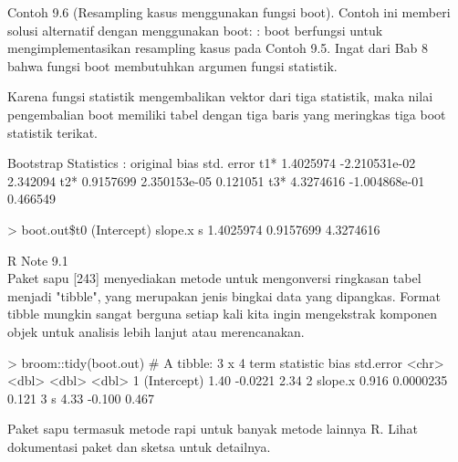 \documentclass[a4paper,12pt]{article}
\theoremstyle{definition}
\begin{document}
Contoh 9.6 
(Resampling kasus menggunakan fungsi boot). Contoh ini memberi solusi alternatif dengan menggunakan boot: : boot berfungsi untuk mengimplementasikan resampling kasus pada Contoh 9.5. Ingat dari Bab 8 bahwa fungsi boot membutuhkan argumen fungsi statistik.
Karena fungsi statistik mengembalikan vektor dari tiga statistik, maka nilai pengembalian boot memiliki tabel dengan tiga baris yang meringkas tiga boot statistik terikat.
\begin{spverbatim}
Bootstrap Statistics :
     original          bias  std. error
t1* 1.4025974 -2.210531e-02  2.342094
t2* 0.9157699  2.350153e-05  0.121051
t3* 4.3274616 -1.004868e-01  0.466549
\end{spverbatim} 

\begin{spverbatim}
> boot.out\$t0
(Intercept) slope.x s
1.4025974 0.9157699 4.3274616
\end{spverbatim}
R Note 9.1\\ 

Paket sapu [243] menyediakan metode untuk mengonversi ringkasan tabel menjadi "tibble", yang merupakan jenis bingkai data yang dipangkas. Format tibble mungkin sangat berguna setiap kali kita ingin mengekstrak komponen objek untuk analisis lebih lanjut atau merencanakan.\\
\begin{spverbatim}
> broom::tidy(boot.out)
# A tibble: 3 x 4
    term       statistic   bias      std.error
    <chr>       <dbl>     <dbl>      <dbl>
1 (Intercept)   1.40     -0.0221     2.34
2 slope.x       0.916     0.0000235  0.121
3 s             4.33     -0.100      0.467
\end{spverbatim}
Paket sapu termasuk metode rapi untuk banyak metode lainnya R. Lihat dokumentasi paket dan sketsa untuk detailnya. 
\end{document}
